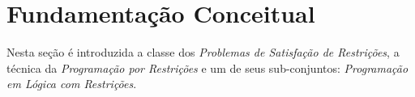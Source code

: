 \documentclass[12pt]{article}
\theoremstyle{definition}
\newtheorem{defn}{Definição}[section]
\begin{document}
\section{Fundamentação Conceitual}
\label{sec_fundamentos}

\begin{comment}
Esta seção tem por objetivo correlacionar os conceitos necessários. Inicialmente é apresentado os conceitos básicos de problemas NP-Completos. 
\end{comment}

Nesta seção  é introduzida a classe dos {\em Problemas de Satisfação de Restrições}, a técnica da  {\em Programação por Restrições} e um de seus sub-conjuntos: {\em Programação em Lógica com Restrições}.

\begin{comment}
\subsection{Problemas NP}

Na teoria da complexidade computacional, {\em NP} é o acrônimo em inglês para Tempo Polinomial Não-Determinístico ({\em Non-Deterministic Polynomial Time}) que denota o conjunto de problemas que são decidíveis em tempo polinomial por uma máquina de Turing\footnote{A máquina de Turing: é um dispositivo teórico, conhecido como \emph{máquina universal}, que foi concebido pelo matemático britânico Alan Turing (1912-1954).} não-determinística\footnote{Máquina de Turing Não-Determinística: é aquela onde a tabela de ação contém múltiplas entradas para uma combinação de um símbolo $\times$ estado.}. Uma definição equivalente é o conjunto de problemas que podem ser verificados em tempo polinomial por uma máquina de Turing determinística\footnote{Máquina de Turing Determinística: é aquela onde a tabela de ação contém no máximo uma entrada para cada combinação de símbolo $\times$ estado.}.

\begin{defn}
\label{def:NP}

Um problema sendo resolvido por uma máquina de Turing $M$ é dito de complexidade de tempo $T(n)$ sempre que $M$ recebe uma entrada $w$ de comprimento $n$ e $M$ pára depois de efetuar no máximo $T(n)$ movimentos, independente do fato de $M$ aceitar ou não a entrada \cite{sipser_2006_a}. Formalmente, se diz que uma linguagem $L$ esta na classe $NP$ se existe uma máquina de Turing não-determinística $M$ e uma complexidade de tempo polinomial $T(n)$ tais que $L = L(M)$ e, quando $M$ recebe uma entrada de comprimento $n$ de forma que não exista nenhuma seqüência de mais de $T(n)$ movimentos de $M$ \cite{sipser_2006_a}. Sendo assim, $P \subseteq NP$ \/ por definição da teoria geral de autômatos ficando evidente se $M$ executa o não-determinismo em paralelo.
\end{defn}

\end{comment}
\end{document}
